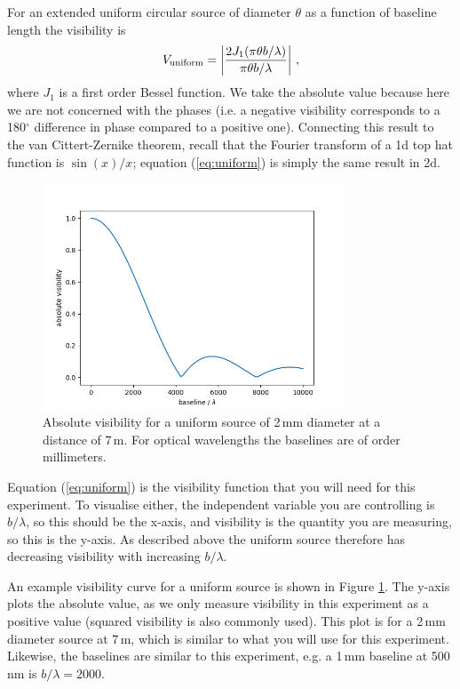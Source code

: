 \documentclass[11pt]{article}
\begin{document}
For an extended uniform circular source of diameter $\theta$ as a function of baseline length the visibility is
\begin{equation}\label{eq:uniform}
    V_{\rm uniform} =  \left\vert \frac{2 J_1(\pi \theta b / \lambda)}{\pi \theta b / \lambda} \right\vert \, ,
\end{equation}
where $J_1$ is a first order Bessel function. We take the absolute value because here we are not concerned with the phases (i.e. a negative visibility corresponds to a 180$^\circ$ difference in phase compared to a positive one). Connecting this result to the van Cittert-Zernike theorem, recall that the Fourier transform of a 1d top hat function is $\sin(x)/x$; equation (\ref{eq:uniform}) is simply the same result in 2d.

\begin{figure}
    \centering
    \includegraphics[width=0.8\textwidth]{doc/uniform_vis.png}
    \caption{Absolute visibility for a uniform source of 2\,mm diameter at a distance of 7\,m. For optical wavelengths the baselines are of order millimeters.}
    \label{fig:uniformvis}
\end{figure}

Equation (\ref{eq:uniform}) is the visibility function that you will need for this experiment. To visualise either, the independent variable you are controlling is $b/\lambda$, so this should be the x-axis, and visibility is the quantity you are measuring, so this is the y-axis. As described above the uniform source therefore has decreasing visibility with increasing $b/\lambda$.

An example visibility curve for a uniform source is shown in Figure \ref{fig:uniformvis}. The y-axis plots the absolute value, as we only measure visibility in this experiment as a positive value (squared visibility is also commonly used). This plot is for a 2\,mm diameter source at 7\,m, which is similar to what you will use for this experiment. Likewise, the baselines are similar to this experiment, e.g. a 1\,mm baseline at 500\,nm is $b/\lambda=2000$.
\end{document}
